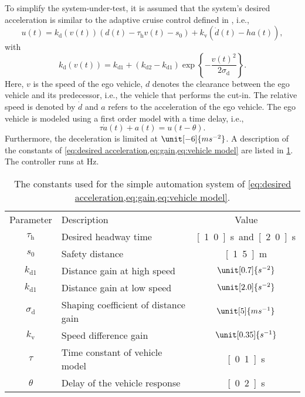 To simplify the system-under-test, it is assumed that the system's desired acceleration is similar to the adaptive cruise control defined in \cite{deGelder2017assessment}, i.e.,
\begin{equation}
	\label{eq:desired acceleration} 
	u(t) = k_{\mathrm{d}}(v(t))(d(t) - \tau_{\mathrm{h}} v(t) - s_0) + k_{\mathrm{v}}\left(\dot{d}(t) - ha(t) \right),
\end{equation}
with
\begin{equation}
	\label{eq:gain}
	k_{\mathrm{d}}(v(t)) = k_{\mathrm{d1}} + \left( k_{\mathrm{d2}} - k_{\mathrm{d1}} \right) \exp \left\{ -\frac{v(t)^2}{2\sigma_{\mathrm{d}}} \right\}.
\end{equation}
Here, $v$ is the speed of the ego vehicle, $d$ denotes the clearance between the ego vehicle and its predecessor, i.e., the vehicle that performs the cut-in. The relative speed is denoted by $\dot{d}$ and $a$ refers to the acceleration of the ego vehicle. The ego vehicle is modeled using a first order model with a time delay, i.e.,
\begin{equation}
	\label{eq:vehicle model}
	\tau \dot{a}(t) + a(t) = u(t - \theta).
\end{equation}
Furthermore, the deceleration is limited at $\unit[-6]{ms^{-2}}$. A description of the constants of \cref{eq:desired acceleration,eq:gain,eq:vehicle model} are listed in \cref{tab:constants}. The controller runs at \unit[100]{Hz}.

\begin{table}
	\centering
	\caption{The constants used for the simple automation system of \cref{eq:desired acceleration,eq:gain,eq:vehicle model}.}
	\label{tab:constants}
	\begin{tabular}{clc}
		\toprule
		Parameter & Description & Value \\ \otoprule
		$\tau_{\mathrm{h}}$ & Desired headway time & \unit[1.0]{s} and \unit[2.0]{s} \\
		$s_0$ & Safety distance & \unit[1.5]{m} \\
		$k_{\mathrm{d1}}$ & Distance gain at high speed & $\unit[0.7]{s^{-2}}$ \\
		$k_{\mathrm{d1}}$ & Distance gain at low speed & $\unit[2.0]{s^{-2}}$ \\
		$\sigma_{\mathrm{d}}$ & Shaping coefficient of distance gain & $\unit[5]{ms^{-1}}$ \\
		$k_{\mathrm{v}}$ & Speed difference gain & $\unit[0.35]{s^{-1}}$ \\
		$\tau$ & Time constant of vehicle model & \unit[0.1]{s} \\
		$\theta$ & Delay of the vehicle response & \unit[0.2]{s} \\
		\bottomrule
	\end{tabular}
\end{table}

